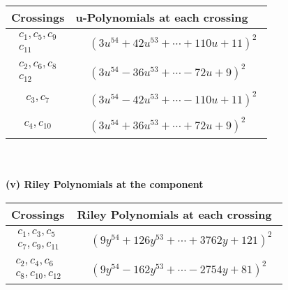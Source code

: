 \documentclass[1p]{elsarticle_modified}
\theoremstyle{definition}
\begin{document}
\begin{tabular}{m{50pt}|m{274pt}}
Crossings & \hspace{64pt}u-Polynomials at each crossing \\
\hline $$\begin{aligned}c_{1},c_{5},c_{9}\\c_{11}\end{aligned}$$&$\begin{aligned}
&(3 u^{54}+42 u^{53}+\cdots+110 u+11)^{2}
\end{aligned}$\\
\hline $$\begin{aligned}c_{2},c_{6},c_{8}\\c_{12}\end{aligned}$$&$\begin{aligned}
&(3 u^{54}-36 u^{53}+\cdots-72 u+9)^{2}
\end{aligned}$\\
\hline $$\begin{aligned}c_{3},c_{7}\end{aligned}$$&$\begin{aligned}
&(3 u^{54}-42 u^{53}+\cdots-110 u+11)^{2}
\end{aligned}$\\
\hline $$\begin{aligned}c_{4},c_{10}\end{aligned}$$&$\begin{aligned}
&(3 u^{54}+36 u^{53}+\cdots+72 u+9)^{2}
\end{aligned}$\\
\hline
\end{tabular}\\~\\
\newpage\renewcommand{\arraystretch}{1}
\flushleft \textbf{(v) Riley Polynomials at the component}\newline \\
\begin{tabular}{m{50pt}|m{274pt}}
Crossings & \hspace{64pt}Riley Polynomials at each crossing \\
\hline $$\begin{aligned}c_{1},c_{3},c_{5}\\c_{7},c_{9},c_{11}\end{aligned}$$&$\begin{aligned}
&(9 y^{54}+126 y^{53}+\cdots+3762 y+121)^{2}
\end{aligned}$\\
\hline $$\begin{aligned}c_{2},c_{4},c_{6}\\c_{8},c_{10},c_{12}\end{aligned}$$&$\begin{aligned}
&(9 y^{54}-162 y^{53}+\cdots-2754 y+81)^{2}
\end{aligned}$\\
\hline
\end{tabular}\\~\\
\end{document}

